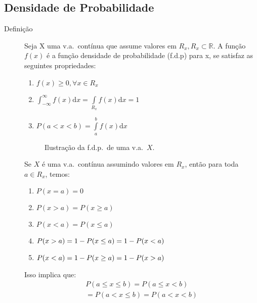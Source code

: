    \subsection{Densidade de Probabilidade}
   \begin{description}
     \item [Definição] Seja X uma v.a.\ contínua que assume valores em $R_{x},R_{x} \subset \mathbb{R}$.
       A função $f(x)$ é a função densidade de probabilidade (f.d.p) para x, se satisfaz as 
       seguintes propriedades: 

       \begin{enumerate}[label=(\roman*)]
         \item $\displaystyle{f(x)\geq 0, \forall x \in R_{x}}$\\
         \item $\displaystyle{\int_{-\infty}^{\infty} \!f(x) \mathrm{d}x= \int \limits_{R_{x}} \!f(x) \mathrm{d}x=1}$
         \item $P(a<x<b)=\displaystyle{\int \limits^b_a \!f(x) \mathrm{d}x}$
       \end{enumerate}
       \begin{figure}[htpb]
         \centering
         
         \caption{Ilustração da f.d.p.\ de uma v.a.\ $X$.}
         \label{fig:25}

       \end{figure}
       \begin{obs}Se $X$ é uma v.a.\ contínua assumindo valores em $R_{x}$, então para toda 
         $a \in R_{x}$, temos: 

         \begin{enumerate}[label=(\alph*)]

           \item $P(x=a)=0$
           \item $P(x>a)=P(x\geq a)$
           \item $P(x<a)=P(x\leq a)$
           \item $P(x>a)=1- P(x \leq a)\\ = 1-P(x<a)$
           \item $P(x<a)=1-P(x \geq a)\\= 1-P(x>a)$

         \end{enumerate}
Isso implica que:
         \begin{align*}
           P(a\le x \le b)= P(a\le x < b)\\
           = P(a<x \le b)= P(a<x<b)
         \end{align*}
     \end{obs}       \end{description}
